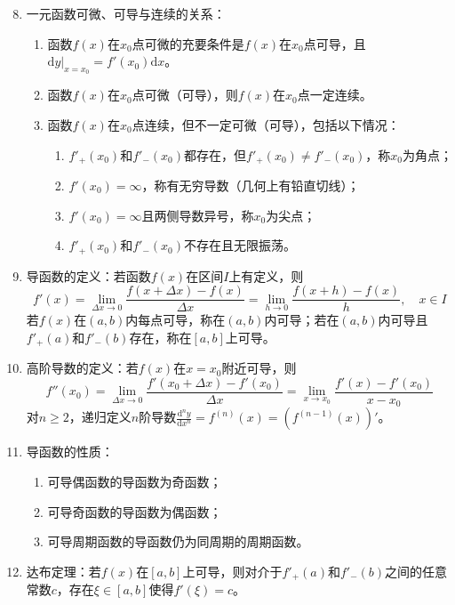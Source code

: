 \documentclass[UTF8]{ctexart}
\theoremstyle{remark}
\begin{document}
\begin{enumerate}
	\setcounter{enumi}{7}
	
	\item 一元函数可微、可导与连续的关系：
	\begin{enumerate}
		\item 函数$f(x)$在$x_0$点可微的充要条件是$f(x)$在$x_0$点可导，且$\mathrm{d}y|_{x=x_0} = f'(x_0)\mathrm{d}x$。
		\item 函数$f(x)$在$x_0$点可微（可导），则$f(x)$在$x_0$点一定连续。
		\item 函数$f(x)$在$x_0$点连续，但不一定可微（可导），包括以下情况：
		\begin{enumerate}
			\item $f'_+(x_0)$和$f'_-(x_0)$都存在，但$f'_+(x_0) \neq f'_-(x_0)$，称$x_0$为角点；
			\item $f'(x_0) = \infty$，称有无穷导数（几何上有铅直切线）；
			\item $f'(x_0) = \infty$且两侧导数异号，称$x_0$为尖点；
			\item $f'_+(x_0)$和$f'_-(x_0)$不存在且无限振荡。
		\end{enumerate}
	\end{enumerate}
	
	\item 导函数的定义：若函数$f(x)$在区间$I$上有定义，则
	\[
	f'(x) = \lim_{\Delta x \to 0} \frac{f(x+\Delta x)-f(x)}{\Delta x} = \lim_{h \to 0} \frac{f(x+h)-f(x)}{h}, \quad x \in I
	\]
	若$f(x)$在$(a,b)$内每点可导，称在$(a,b)$内可导；若在$(a,b)$内可导且$f'_+(a)$和$f'_-(b)$存在，称在$[a,b]$上可导。
	
	\item 高阶导数的定义：若$f(x)$在$x=x_0$附近可导，则
	\[
	f''(x_0) = \lim_{\Delta x \to 0} \frac{f'(x_0+\Delta x)-f'(x_0)}{\Delta x} = \lim_{x \to x_0} \frac{f'(x)-f'(x_0)}{x-x_0}
	\]
	对$n \geq 2$，递归定义$n$阶导数$\frac{\mathrm{d}^n y}{\mathrm{d}x^n} = f^{(n)}(x) = (f^{(n-1)}(x))'$。
	
	\item 导函数的性质：
	\begin{enumerate}
		\item 可导偶函数的导函数为奇函数；
		\item 可导奇函数的导函数为偶函数；
		\item 可导周期函数的导函数仍为同周期的周期函数。
	\end{enumerate}
	
	\item 达布定理：若$f(x)$在$[a,b]$上可导，则对介于$f'_+(a)$和$f'_-(b)$之间的任意常数$c$，存在$\xi \in [a,b]$使得$f'(\xi) = c$。
	

\end{enumerate}
\end{document}
